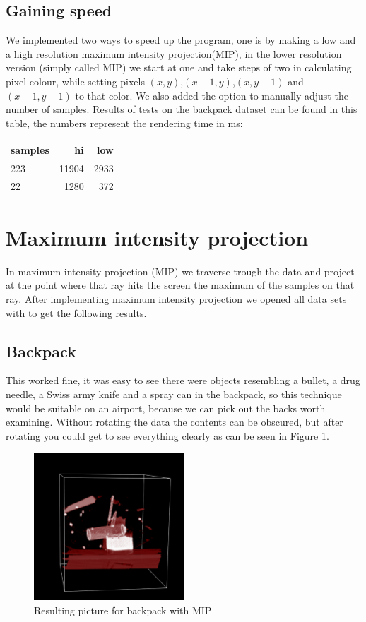 \documentclass[a4paper,twoside,11pt]{article}
\begin{document}
\subsection{Gaining speed}
We implemented two ways to speed up the program, one is by making a low and a high resolution maximum intensity projection(MIP), in the lower resolution version (simply called MIP) we start at one and take steps of two in calculating pixel colour, while setting pixels $(x,y)$,$(x-1,y)$,$(x,y-1)$ and $(x-1,y-1)$ to that color. We also added the option to manually adjust the number of samples. Results of tests on the backpack dataset can be found in this table, the numbers represent the rendering time in ms:
\begin{center}
  \begin{tabular}{| l || r | r | }
    \hline
    samples & hi & low \\ \hline
    223 & 11904 & 2933 \\ \hline
    22 & 1280 & 372 \\
    \hline
  \end{tabular}
\end{center}

\section{Maximum intensity projection}
In maximum intensity projection (MIP) we traverse trough the data and project at the point where that ray hits the screen the maximum of the samples on that ray. After implementing maximum intensity projection we opened all data sets with to get the following results.
\subsection{Backpack}
This worked fine, it was easy to see there were objects resembling a bullet, a drug needle, a Swiss army knife and a spray can in the backpack, so this technique would be suitable on an airport, because we can pick out the backs worth examining. Without rotating the data the contents can be obscured, but after rotating you could get to see everything clearly as can be seen in Figure \ref{MB}.
\begin{figure}[!h]
  \centering
  \includegraphics[width=0.5\textwidth]{MB.png}
  \caption{Resulting picture for backpack with MIP}
  \label{MB}
\end{figure}
\end{document}
